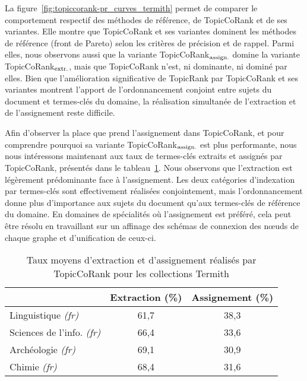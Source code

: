         La figure~\ref{fig:topiccorank-pr_curves_termith} permet de comparer le
        comportement respectif des méthodes de référence, de TopicCoRank et de
        ses variantes. Elle montre que TopicCoRank et ses variantes dominent les
        méthodes de référence (front de Pareto) selon les critères de précision
        et de rappel. Parmi elles, nous observons aussi que la variante
        TopicCoRank$_\textnormal{assign.}$ domine la variante
        TopicCoRank$_\textnormal{extr.}$, mais que TopicCoRank n'est, ni
        dominante, ni dominé par elles. Bien que l'amélioration significative de
        TopicRank par TopicCoRank et ses variantes montrent l'apport de
        l'ordonnancement conjoint entre sujets du document et termes-clés du
        domaine, la réalisation simultanée de l'extraction et de l'assignement
        reste difficile.
        

        Afin d'observer la place que prend l'assignement dans TopicCoRank, et
        pour comprendre pourquoi sa variante TopicCoRank$_\textnormal{assign.}$
        est plus performante, nous nous intéressons maintenant aux taux de
        termes-clés extraits et assignés par TopicCoRank, présentés dans le
        tableau~\ref{tab:assignment_ratio_termith}. Nous observons que
        l'extraction est légèrement prédominante face à l'assignement. Les deux
        catégories d'indexation par termes-clés sont effectivement réalisées
        conjointement, mais l'ordonnancement donne plus d'importance aux sujets
        du document qu'aux termes-clés de référence du domaine. En domaines de
        spécialités où l'assignement est préféré, cela peut être résolu en
        travaillant sur un affinage des schémas de connexion des n\oe{}uds de
        chaque graphe et d'unification de ceux-ci.
        \begin{table}
          \centering
          \begin{tabular}{l|c|c}
              \toprule
              & Extraction (\%) & Assignement (\%)\\
              \hline
              Linguistique \textit{(fr)} & 61,7 & 38,3\\
              Sciences de l'info. \textit{(fr)} & 66,4 & 33,6\\
              Archéologie \textit{(fr)} & 69,1 & 30,9\\
              Chimie \textit{(fr)} & 68,4 & 31,6\\
              \bottomrule
          \end{tabular}
          \caption{Taux moyens d'extraction et d'assignement réalisés par
                   TopicCoRank pour les collections Termith
                   \label{tab:assignment_ratio_termith}}
        \end{table}

